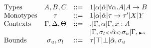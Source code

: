 \documentclass[paper.tex]{subfiles}
\begin{document}
\[
\begin{array}{lccl}
\text{Types} & A,B,C &::=& 1 | \alpha | \hat{\alpha} | \forall \alpha.A | A \rightarrow B\\
\text{Monotypes} & \tau &::=& 1 | \alpha | \hat{\alpha} | \tau \rightarrow \tau' | X | Y \\
\text{Contexts} & \Gamma, \Delta, \Theta &::=& . | \Gamma, \alpha | \Gamma, x:A \\ &&& | \Gamma, \sigma_{l} {\scriptstyle{<:}} \hat{\alpha} {\scriptstyle{<:}} \sigma_{u} | \Gamma, {\scriptscriptstyle {\blacktriangleright \hat{\alpha}}}\\
\text{Bounds} & \sigma_{u}, \sigma_{l} &::=& \tau | \top | \bot | \hat{\alpha}, \sigma_{u}
\end{array}
\]
\end{document}

